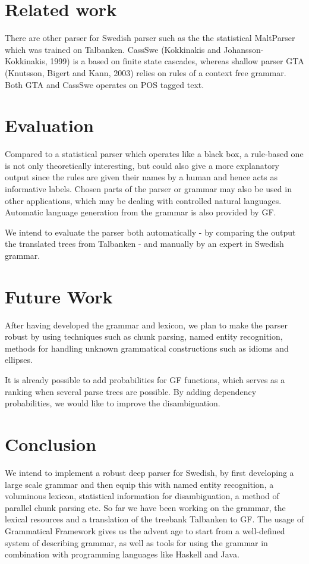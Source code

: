 \documentclass[submission]{eptcs} %
\begin{document}
\section{Related work}
There are other parser for Swedish parser such as the the statistical MaltParser\cite{malt}
which was trained on Talbanken. 
CassSwe (Kokkinakis and Johansson-Kokkinakis, 1999) is a  based on finite state cascades,
whereas shallow parser GTA (Knutsson, Bigert and Kann, 2003) relies on rules of 
a context free grammar. Both GTA and CassSwe operates on POS tagged text.


\section{Evaluation}
Compared to a statistical parser which operates like a black box,
a rule-based one is not only theoretically interesting,
but could also give a more explanatory output since the rules
are given their names by a human and hence acts as informative labels.
Chosen parts of the parser or grammar may also be used in other applications,
which may be dealing with controlled natural languages. Automatic language
generation from the grammar is also provided by GF.

We intend to evaluate the parser both automatically - by comparing the output
the translated trees from Talbanken - and manually by an expert in Swedish grammar.

\section{Future Work}

After having developed the grammar and lexicon, we plan to 
make the parser robust by using techniques such as chunk parsing, named
entity recognition, methods for handling unknown 
grammatical constructions such as idioms and ellipses. %

It is already possible to add probabilities for GF functions,
which serves as a ranking when several parse trees are possible.
By adding dependency probabilities, we would like to improve the
disambiguation.


\section{Conclusion}
We intend to implement a robust deep parser for Swedish, by first developing
a large scale grammar and then equip this with named entity recognition, a
voluminous lexicon, statistical information for disambiguation,
a method of parallel chunk parsing etc.
So far we have been working on the grammar, the lexical resources and
a translation of the treebank Talbanken to GF.
The usage of Grammatical Framework gives us the advent age to start from
a well-defined system of describing grammar, as well as tools for
using the grammar in combination with programming languages like Haskell
and Java. 
\end{document}
